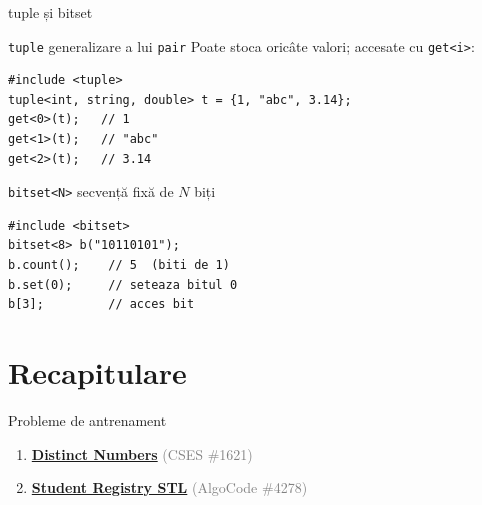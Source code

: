 ﻿\documentclass{beamer}
\begin{document}
\begin{frame}[fragile]{tuple și bitset}
  \begin{block}{\texttt{tuple} \textemdash{} generalizare a lui \texttt{pair}}
    Poate stoca oricâte valori; accesate cu \texttt{get<i>}:
    \begin{lstlisting}
#include <tuple>
tuple<int, string, double> t = {1, "abc", 3.14};
get<0>(t);   // 1
get<1>(t);   // "abc"
get<2>(t);   // 3.14
    \end{lstlisting}
  \end{block}

  \begin{block}{\texttt{bitset<N>} \textemdash{} secvență fixă de $N$ biți}
    \begin{lstlisting}
#include <bitset>
bitset<8> b("10110101");
b.count();    // 5  (biti de 1)
b.set(0);     // seteaza bitul 0
b[3];         // acces bit
    \end{lstlisting}
  \end{block}
\end{frame}

\section{Recapitulare}

\begin{frame}{Probleme de antrenament}
  \begin{enumerate}\itemsep8pt
    \item \href{https://cses.fi/problemset/task/1621}{\textbf{Distinct Numbers}}
          \textcolor{gray}{(CSES \#1621)}
    \item \href{https://code.algolymp.com/problems/4278}{\textbf{Student Registry STL}}
          \textcolor{gray}{(AlgoCode \#4278)}
  \end{enumerate}
\end{frame}
\end{document}

